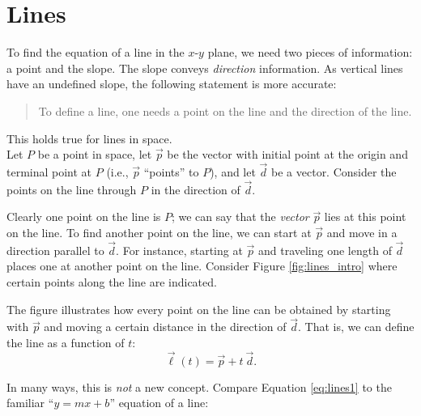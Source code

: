\section{Lines}\label{sec:lines}

To find the equation of a line in the $x$-$y$ plane, we need two pieces of information: a point and the slope. The slope conveys \textit{direction} information. As vertical lines have an undefined slope, the following statement is more accurate:

\begin{quotation}
\noindent To define a line, one needs a point on the line and the direction of the line.
\end{quotation}

This holds true for lines in space.\\

Let $P$ be a point in space, let $\vec p$ be the vector with initial point at the origin and terminal point at $P$ (i.e., $\vec p$ ``points'' to $P$), and let $\vec d$ be a vector. Consider the points on the line through $P$ in the direction of $\vec d$. 

Clearly one point on the line is $P$; we can say that the \emph{vector} $\vec p$ lies at this point on the line. To find another point on the line, we can start at $\vec p$ and move in a  direction parallel to $\vec d$. For instance, starting at $\vec p$ and traveling one length of $\vec d$ places one at another point on the line. Consider Figure \ref{fig:lines_intro} where certain points along the line are indicated. 

The figure illustrates how every point on the line can be obtained by starting with $\vec p$ and moving a certain distance in the direction of $\vec d$. That is, we can define the line as a function of $t$:
\begin{equation}\vec\ell(t) = \vec p + t\ \vec d.\label{eq:lines1}\end{equation}

In many ways, this is \textit{not} a new concept. Compare Equation \eqref{eq:lines1} to the familiar ``$y=mx+b$'' equation of a line:

